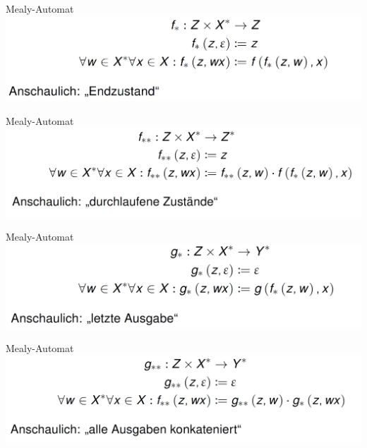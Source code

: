 \documentclass[handout]{beamer}
\begin{document}
\begin{frame}{Mealy-Automat}
	\includegraphics[scale=0.25]{images/MealyEnd.png}
\end{frame}

\begin{frame}{Mealy-Automat}
	\includegraphics[scale=0.25]{images/MealyEndKonkat.png}
\end{frame}

\begin{frame}{Mealy-Automat}
	\includegraphics[scale=0.25]{images/MealyOut.png}
\end{frame}

\begin{frame}{Mealy-Automat}
	\includegraphics[scale=0.25]{images/MealyOutKonkat.png}
\end{frame}
\end{document}

